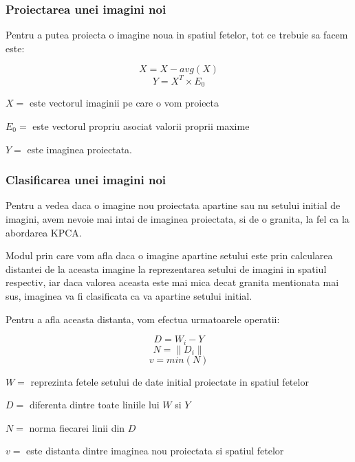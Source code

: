\documentclass[12pt]{article}
\begin{document}
\subsubsection{Proiectarea unei imagini noi}
Pentru a putea proiecta o imagine noua in spatiul fetelor, tot ce trebuie sa facem este: 

\begin{equation}
X=X-avg(X)
\end{equation}
\begin{equation}
Y=X^T \times E_0
\end{equation}

$X=$ este vectorul imaginii pe care o vom proiecta

$E_0=$ este vectorul propriu asociat valorii proprii maxime

$Y=$ este imaginea proiectata.

\subsubsection{Clasificarea unei imagini noi}

Pentru a vedea daca o imagine nou proiectata apartine sau nu setului initial de imagini, avem nevoie mai intai de imaginea proiectata, si de o granita, la fel ca la abordarea KPCA.

Modul prin care vom afla daca o imagine apartine setului este prin calcularea distantei de la aceasta imagine la reprezentarea setului de imagini in spatiul respectiv, iar daca valorea aceasta este mai mica decat granita mentionata mai sus, imaginea va fi clasificata ca va apartine setului initial.

Pentru a afla aceasta distanta, vom efectua urmatoarele operatii:

\begin{equation}
D=W_i-Y
\end{equation}
\begin{equation}
N=\| D_i  \|
\end{equation}
\begin{equation}
v=min(N)
\end{equation}

$W=$ reprezinta fetele setului de date initial proiectate in spatiul fetelor

$D=$ diferenta dintre toate liniile lui $W$ si $Y$

$N=$ norma fiecarei linii din $D$

$v=$ este distanta dintre imaginea nou proiectata si spatiul fetelor
\end{document}
